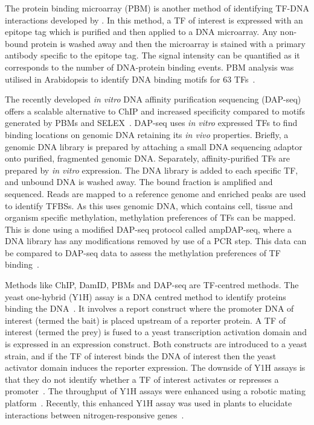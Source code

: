 \documentclass[../main.tex]{subfiles}
\begin{document}
The protein binding microarray (PBM) is another method of identifying TF-DNA interactions developed by \textcite*{bulykProteinBindingMicroarrays2007}. In this method, a TF of interest is expressed with an epitope tag which is purified and then applied to a DNA microarray. Any non-bound protein is washed away and then the microarray is stained with a primary antibody specific to the epitope tag. The signal intensity can be quantified as it corresponds to the number of DNA-protein binding events. PBM analysis was utilised in Arabidopsis to identify DNA binding motifs for 63 TFs~\autocite{franco-zorrillaDNAbindingSpecificitiesPlant2014}.

The recently developed \textit{in vitro} DNA affinity purification sequencing (DAP-seq) offers a scalable alternative to ChIP and increased specificity compared to motifs generated by PBMs and SELEX~\autocite{omalleyCistromeEpicistromeFeatures2016}.
DAP\hyp{}seq uses \textit{in vitro} expressed TFs to find binding locations on genomic DNA retaining its \textit{in vivo} properties.
Briefly, a genomic DNA library is prepared by attaching a small DNA sequencing adaptor onto purified, fragmented genomic DNA.
Separately, affinity\hyp{}purified TFs are prepared by \textit{in vitro} expression.
The DNA library is added to each specific TF, and unbound DNA is washed away.
The bound fraction is amplified and sequenced.
Reads are mapped to a reference genome and enriched peaks are used to identify TFBSs.
As this uses genomic DNA, which contains cell, tissue and organism specific methylation, methylation preferences of TFs can be mapped.
This is done using a modified DAP\hyp{}seq protocol called ampDAP\hyp{}seq, where a DNA library has any modifications removed by use of a PCR step.
This data can be compared to DAP\hyp{}seq data to assess the methylation preferences of TF binding~\autocite{omalleyCistromeEpicistromeFeatures2016}.

Methods like ChIP, DamID, PBMs and DAP-seq are TF\hyp{}centred methods.
The yeast one\hyp{}hybrid (Y1H) assay is a DNA centred method to identify proteins binding the DNA~\autocite{liIsolationORC6Component1993}.
It involves a report construct where the promoter DNA of interest (termed the bait) is placed upstream of a reporter protein.
A TF of interest (termed the prey) is fused to a yeast transcription activation domain and is expressed in an expression construct.
Both constructs are introduced to a yeast strain, and if the TF of interest binds the DNA of interest then the yeast activator domain induces the reporter expression.
The downside of Y1H assays is that they do not identify whether a TF of interest activates or represses a promoter~\autocite{reece-hoyesYeastOnehybridAssays2012}.
The throughput of Y1H assays were enhanced using a robotic mating platform~\autocite{reece-hoyesEnhancedYeastOnehybrid2011}.
Recently, this enhanced Y1H assay was used in plants to elucidate interactions between nitrogen-responsive genes~\autocite{gaudinierTranscriptionalRegulationNitrogenassociated2018}.
\end{document}
